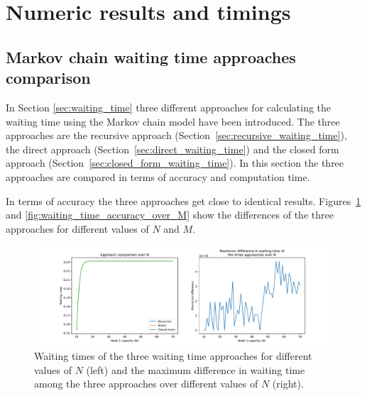 \section{Numeric results and timings}\label{sec:truncation_effect}


\subsection{Markov chain waiting time approaches comparison}
\label{sec:waiting_time_approach_comparison}

In Section \ref{sec:waiting_time} three different approaches for calculating
the waiting time using the Markov chain model have been introduced.
The three approaches are the recursive approach
(Section~\ref{sec:recursive_waiting_time}), the direct approach
(Section~\ref{sec:direct_waiting_time}) and the closed form
approach (Section~\ref{sec:closed_form_waiting_time}).
In this section the three approaches are compared in terms of accuracy and
computation time.

In terms of accuracy the three approaches get close to identical results.
Figures~\ref{fig:waiting_time_accuracy_over_N} and
\ref{fig:waiting_time_accuracy_over_M} show the differences of the three
approaches for different values of \(N\) and \(M\).


\begin{figure}[H]
    \includegraphics[width=\textwidth]{chapters/03_queueing_model/img/numeric_results_and_timings/waiting_time_formulas_comparison/waiting_time_over_N.pdf}
    \caption{
        Waiting times of the three waiting time approaches for different
        values of \(N\) (left) and the maximum difference in waiting time among
        the three approaches over different values of \(N\) (right).
    }
    \label{fig:waiting_time_accuracy_over_N}
\end{figure}

